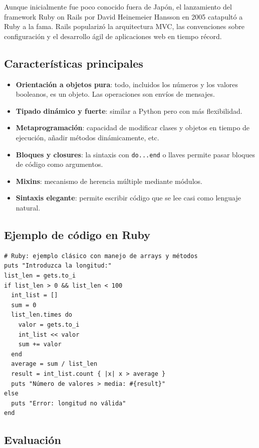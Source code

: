 Aunque inicialmente fue poco conocido fuera de Japón, el lanzamiento del framework Ruby on Rails por David Heinemeier Hansson en 2005 catapultó a Ruby a la fama. Rails popularizó la arquitectura MVC, las convenciones sobre configuración y el desarrollo ágil de aplicaciones web en tiempo récord.

\subsection{Características principales}

\begin{itemize}
  \item \textbf{Orientación a objetos pura}: todo, incluidos los números y los valores booleanos, es un objeto. Las operaciones son envíos de mensajes.
  \item \textbf{Tipado dinámico y fuerte}: similar a Python pero con más flexibilidad.
  \item \textbf{Metaprogramación}: capacidad de modificar clases y objetos en tiempo de ejecución, añadir métodos dinámicamente, etc.
  \item \textbf{Bloques y closures}: la sintaxis con \texttt{do...end} o llaves permite pasar bloques de código como argumentos.
  \item \textbf{Mixins}: mecanismo de herencia múltiple mediante módulos.
  \item \textbf{Sintaxis elegante}: permite escribir código que se lee casi como lenguaje natural.
\end{itemize}

\subsection{Ejemplo de código en Ruby}

\begin{verbatim}
# Ruby: ejemplo clásico con manejo de arrays y métodos
puts "Introduzca la longitud:"
list_len = gets.to_i
if list_len > 0 && list_len < 100
  int_list = []
  sum = 0
  list_len.times do
    valor = gets.to_i
    int_list << valor
    sum += valor
  end
  average = sum / list_len
  result = int_list.count { |x| x > average }
  puts "Número de valores > media: #{result}"
else
  puts "Error: longitud no válida"
end
\end{verbatim}

\subsection{Evaluación}

